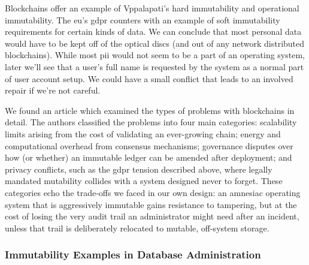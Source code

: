 Blockchains offer an example of Vppalapati's \gls{hard immutability} and \gls{operational immutability}.  The \gls{eu}'s \gls{gdpr} counters with an example of \gls{soft immutability} requirements for certain kinds of data.  We can conclude that most personal data would have to be kept off of the optical discs (and out of any network distributed blockchains).  While most \gls{pii} would not seem to be a part of an \gls{operating system}, later we'll see that a user's full name is requested by the system as a normal part of user account setup.  We could have a small conflict that leads to an involved repair if we're not careful.

We found an article which examined the types of problems with blockchains in detail.  The authors classified the problems into four main categories: scalability limits arising from the cost of validating an ever-growing chain; energy and computational overhead from consensus mechanisms; governance disputes over how (or whether) an immutable ledger can be amended after deployment; and privacy conflicts, such as the \gls{gdpr} tension described above, where legally mandated mutability collides with a system designed never to forget.  These categories echo the trade-offs we faced in our own design: an amnesiac \gls{operating system} that is aggressively immutable gains resistance to tampering, but at the cost of losing the very audit trail an administrator might need after an incident, unless that trail is deliberately relocated to mutable, off-system storage.

\subsubsection{Immutability Examples in Database Administration}

